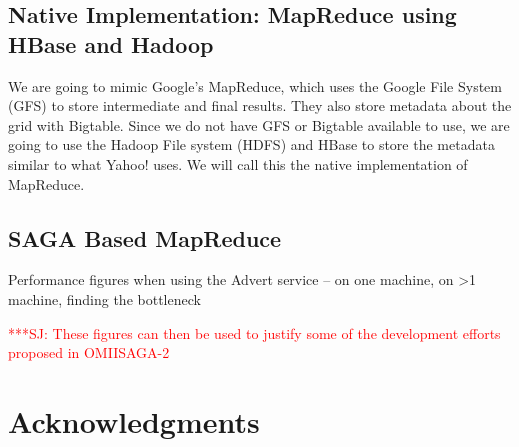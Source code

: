 \documentclass{rspublic}
\newcommand{\jhanote}[1]{ {\textcolor{red} { ***SJ: #1 }}}
\newcommand{\jhanote}[1]{}
\begin{document}
\subsection*{Native Implementation: MapReduce using HBase and Hadoop}
We are going to mimic Google's MapReduce, which uses the Google File System (GFS)
to store intermediate and final results.  They also store metadata about the grid 
with Bigtable.  Since we do not have GFS or Bigtable available to use, we are going 
to use the Hadoop File system (HDFS) and HBase to store the metadata similar to 
what Yahoo! uses.  We will call this the native implementation of MapReduce.

\subsection*{SAGA Based MapReduce}

Performance figures when using the Advert service -- on one machine,
on >1 machine, finding the bottleneck

\jhanote{These figures can then be used to justify some of the 
  development efforts proposed in OMIISAGA-2}

\section{Acknowledgments}



\end{document}
